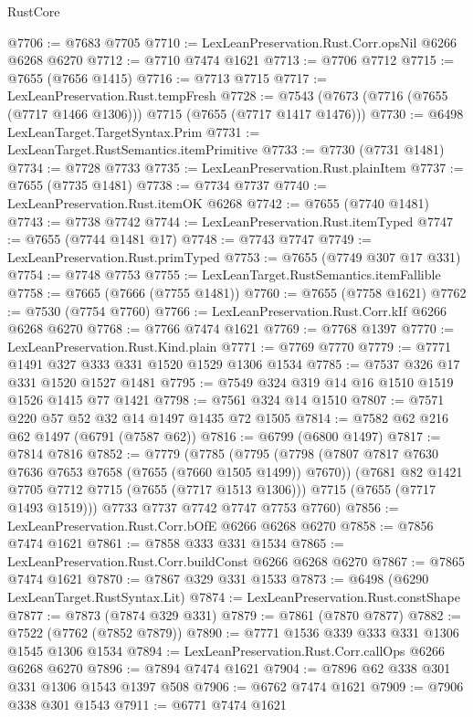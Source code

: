 \begin{lexlean}{RustCore}
\begin{coremodule}
@7706 := @7683 @7705
@7710 := LexLeanPreservation.Rust.Corr.opsNil @6266 @6268 @6270
@7712 := @7710 @7474 @1621
@7713 := @7706 @7712
@7715 := @7655 (@7656 @1415)
@7716 := @7713 @7715
@7717 := LexLeanPreservation.Rust.tempFresh
@7728 := @7543 (@7673 (@7716 (@7655 (@7717 @1466 @1306))) @7715 (@7655 (@7717 @1417 @1476)))
@7730 := @6498 LexLeanTarget.TargetSyntax.Prim
@7731 := LexLeanTarget.RustSemantics.itemPrimitive
@7733 := @7730 (@7731 @1481)
@7734 := @7728 @7733
@7735 := LexLeanPreservation.Rust.plainItem
@7737 := @7655 (@7735 @1481)
@7738 := @7734 @7737
@7740 := LexLeanPreservation.Rust.itemOK @6268
@7742 := @7655 (@7740 @1481)
@7743 := @7738 @7742
@7744 := LexLeanPreservation.Rust.itemTyped
@7747 := @7655 (@7744 @1481 @17)
@7748 := @7743 @7747
@7749 := LexLeanPreservation.Rust.primTyped
@7753 := @7655 (@7749 @307 @17 @331)
@7754 := @7748 @7753
@7755 := LexLeanTarget.RustSemantics.itemFallible
@7758 := @7665 (@7666 (@7755 @1481))
@7760 := @7655 (@7758 @1621)
@7762 := @7530 (@7754 @7760)
@7766 := LexLeanPreservation.Rust.Corr.kIf @6266 @6268 @6270
@7768 := @7766 @7474 @1621
@7769 := @7768 @1397
@7770 := LexLeanPreservation.Rust.Kind.plain
@7771 := @7769 @7770
@7779 := @7771 @1491 @327 @333 @331 @1520 @1529 @1306 @1534
@7785 := @7537 @326 @17 @331 @1520 @1527 @1481
@7795 := @7549 @324 @319 @14 @16 @1510 @1519 @1526 @1415 @77 @1421
@7798 := @7561 @324 @14 @1510
@7807 := @7571 @220 @57 @52 @32 @14 @1497 @1435 @72 @1505
@7814 := @7582 @62 @216 @62 @1497 (@6791 (@7587 @62))
@7816 := @6799 (@6800 @1497)
@7817 := @7814 @7816
@7852 := @7779
    (@7785
      (@7795
        (@7798 (@7807 @7817 @7630 @7636 @7653 @7658 (@7655 (@7660 @1505 @1499)) @7670))
        (@7681 @82 @1421 @7705 @7712 @7715 (@7655 (@7717 @1513 @1306)))
        @7715
        (@7655 (@7717 @1493 @1519)))
      @7733
      @7737
      @7742
      @7747
      @7753
      @7760)
@7856 := LexLeanPreservation.Rust.Corr.bOfE @6266 @6268 @6270
@7858 := @7856 @7474 @1621
@7861 := @7858 @333 @331 @1534
@7865 := LexLeanPreservation.Rust.Corr.buildConst @6266 @6268 @6270
@7867 := @7865 @7474 @1621
@7870 := @7867 @329 @331 @1533
@7873 := @6498 (@6290 LexLeanTarget.RustSyntax.Lit)
@7874 := LexLeanPreservation.Rust.constShape
@7877 := @7873 (@7874 @329 @331)
@7879 := @7861 (@7870 @7877)
@7882 := @7522 (@7762 (@7852 @7879))
@7890 := @7771 @1536 @339 @333 @331 @1306 @1545 @1306 @1534
@7894 := LexLeanPreservation.Rust.Corr.callOps @6266 @6268 @6270
@7896 := @7894 @7474 @1621
@7904 := @7896 @62 @338 @301 @331 @1306 @1543 @1397 @508
@7906 := @6762 @7474 @1621
@7909 := @7906 @338 @301 @1543
@7911 := @6771 @7474 @1621

\end{coremodule}
\end{lexlean}
